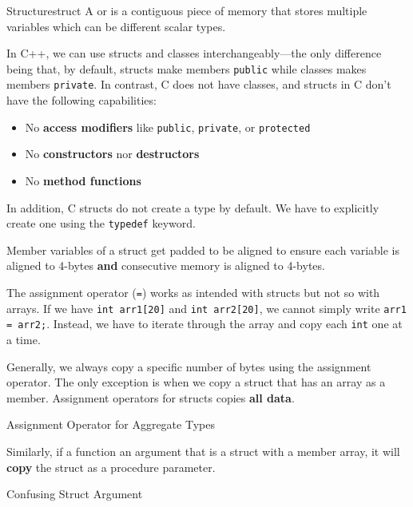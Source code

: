 \documentclass[code]{amznotes}
\begin{document}
\begin{dfnbox}{Structure}{struct}
    A  or  is a contiguous piece of memory that stores multiple variables which can be different scalar types.
\end{dfnbox}

In C++, we can use structs and classes interchangeably---the only difference being that, by default, structs make members \texttt{public} while classes makes members \texttt{private}. In contrast, C does not have classes, and structs in C don't have the following capabilities:

\begin{itemize}
    \item No \textbf{access modifiers} like \texttt{public}, \texttt{private}, or \texttt{protected}
    \item No \textbf{constructors} nor \textbf{destructors}
    \item No \textbf{method functions}
\end{itemize}

In addition, C structs do not create a type by default. We have to explicitly create one using the \texttt{typedef} keyword.

Member variables of a struct get padded to be aligned to ensure each variable is aligned to 4-bytes \textbf{and} consecutive memory is aligned to 4-bytes.

The assignment operator (\texttt{=}) works as intended with structs but not so with arrays. If we have \texttt{int arr1[20]} and \texttt{int arr2[20]}, we cannot simply write \texttt{arr1 = arr2;}. Instead, we have to iterate through the array and copy each \texttt{int} one at a time.

Generally, we always copy a specific number of bytes using the assignment operator. The only exception is when we copy a struct that has an array as a member. Assignment operators for structs copies \textbf{all data}.

\begin{codebox}{Assignment Operator for Aggregate Types}{}
\end{codebox}

Similarly, if a function an argument that is a struct with a member array, it will \textbf{copy} the struct as a procedure parameter.

\begin{codebox}{Confusing Struct Argument}{}
\end{codebox}
\end{document}
